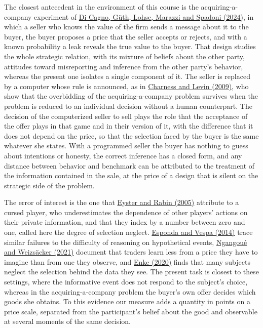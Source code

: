 \documentclass[11pt,a4paper]{article}
\newcommand{\cy}[2]{\hyperlink{cite.#1}{\textcolor{citecolor}{#2}}}
\begin{document}
The closest antecedent in the environment of this course is the acquiring-a-company experiment of \cy{dicagno}{Di Cagno, G\"uth, Lohse, Marazzi and Spadoni (2024)}, in which a seller who knows the value of the firm sends a message about it to the buyer, the buyer proposes a price that the seller accepts or rejects, and with a known probability a leak reveals the true value to the buyer. That design studies the whole strategic relation, with its mixture of beliefs about the other party, attitudes toward misreporting and inference from the other party's behavior, whereas the present one isolates a single component of it. The seller is replaced by a computer whose rule is announced, as in \cy{charnesslevin}{Charness and Levin (2009)}, who show that the overbidding of the acquiring-a-company problem survives when the problem is reduced to an individual decision without a human counterpart. The decision of the computerized seller to sell plays the role that the acceptance of the offer plays in that game and in their version of it, with the difference that it does not depend on the price, so that the selection faced by the buyer is the same whatever she states. With a programmed seller the buyer has nothing to guess about intentions or honesty, the correct inference has a closed form, and any distance between behavior and benchmark can be attributed to the treatment of the information contained in the sale, at the price of a design that is silent on the strategic side of the problem.

The error of interest is the one that \cy{eysterrabin}{Eyster and Rabin (2005)} attribute to a cursed player, who underestimates the dependence of other players' actions on their private information, and that they index by a number between zero and one, called here the degree of selection neglect. \cy{espondavespa}{Esponda and Vespa (2014)} trace similar failures to the difficulty of reasoning on hypothetical events, \cy{ngangoue}{Ngangou\'e and Weizs\"acker (2021)} document that traders learn less from a price they have to imagine than from one they observe, and \cy{enke}{Enke (2020)} finds that many subjects neglect the selection behind the data they see. The present task is closest to these settings, where the informative event does not respond to the subject's choice, whereas in the acquiring-a-company problem the buyer's own offer decides which goods she obtains. To this evidence our measure adds a quantity in points on a price scale, separated from the participant's belief about the good and observable at several moments of the same decision.
\end{document}
